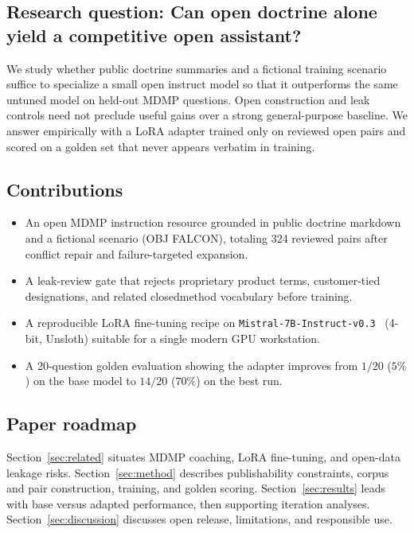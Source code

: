 \documentclass[11pt]{article}
\begin{document}
\subsection{Research question: Can open doctrine alone yield a competitive open assistant?}
\label{sec:intro-rq}

We study whether public doctrine summaries and a fictional training scenario
suffice to specialize a small open instruct model so that it outperforms the
same untuned model on held-out MDMP questions.
Open construction and leak controls need not preclude useful gains over a strong
general-purpose baseline.
We answer empirically with a LoRA adapter trained only on reviewed open pairs
and scored on a golden set that never appears verbatim in training.

\subsection{Contributions}
\label{sec:intro-contrib}
\begin{itemize}[leftmargin=*]
  \item An open MDMP instruction resource grounded in public doctrine markdown
        and a fictional scenario (OBJ FALCON), totaling 324 reviewed pairs after
        conflict repair and failure-targeted expansion.
  \item A leak-review gate that rejects proprietary product terms, customer-tied
        designations, and related closed\-method vocabulary before training.
  \item A reproducible LoRA fine-tuning recipe on
        \texttt{Mistral-7B-Instruct-v0.3}~\citep{mistral7b} (4-bit, Unsloth)
        suitable for a single modern GPU workstation.
  \item A 20-question golden evaluation showing the adapter improves from
        $1/20$ ($5\%$) on the base model to $14/20$ ($70\%$) on the best run.
\end{itemize}

\subsection{Paper roadmap}
\label{sec:intro-roadmap}

Section~\ref{sec:related} situates MDMP coaching, LoRA fine-tuning, and open-data
leakage risks.
Section~\ref{sec:method} describes publishability constraints, corpus and pair
construction, training, and golden scoring.
Section~\ref{sec:results} leads with base versus adapted performance, then
supporting iteration analyses.
Section~\ref{sec:discussion} discusses open release, limitations, and responsible use.
\end{document}
